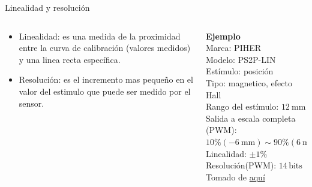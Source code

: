 \documentclass[aspectratio=169]{beamer}
\begin{document}
\begin{frame}{Linealidad y resolución}
    \begin{columns}[c, onlytextwidth]
        \begin{column}{0.55\textwidth}
            \begin{itemize}
                \item Linealidad: es una medida de la proximidad entre la curva de calibración (valores medidos) y una linea recta específica.
                \item Resolución: es el incremento mas pequeño en el valor del estimulo que puede ser medido por el sensor. 
            \end{itemize}
        \end{column}
        \begin{column}{0.40\textwidth}
            \textbf{Ejemplo}\\[4pt]
            Marca: PIHER\\[4pt]
            Modelo: PS2P-LIN\\[4pt]
            Estímulo: posición\\[4pt]
            Tipo: magnetico, efecto Hall\\[4pt]
            Rango del estímulo: $\SI{12}{\milli\meter}$\\[4pt]
            Salida a escala completa (PWM): $10\% (\SI{-6}{\milli\meter}) \sim 90\% (\SI{6}{\milli\meter})$\\[4pt]
            Linealidad: $\pm 1 \%$ \\[4pt]
            Resolución(PWM): $14\,\mathrm{bits}$\\[10pt]
            \tiny{Tomado de \href{https://www.piher.net/pdf/PS2P-LINIntroduction.pdf}{aquí}}
        \end{column}
    \end{columns}
\end{frame}
\end{document}
